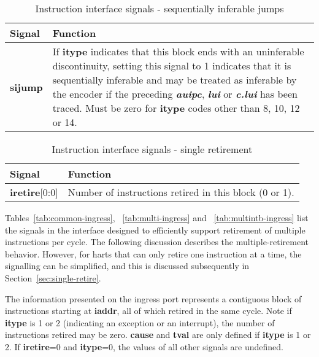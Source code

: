 \begin{table}[htp]
    \centering
    \caption{Instruction interface signals - sequentially inferable jumps}
    \label{tab:sij-ingress}
    \begin{tabulary}{\textwidth}{|l|p{120mm}|}
        \hline
        \textbf {Signal} & \textbf {Function} \\
        \hline
        \textbf{sijump} & If \textbf{itype} indicates that this block ends with an uninferable discontinuity, setting this signal to 1 
        indicates that it is sequentially inferable and may be treated as inferable by the encoder if the preceding 
        \textbf{\textit{auipc}}, \textbf{\textit{lui}} or \textbf{\textit{c.lui}} has been traced.  
        Must be zero for \textbf{itype} codes other than 8, 10, 12 or 14.\\
        \hline
    \end{tabulary}
\end{table}


\begin{table}[htp]
    \centering
    \caption{Instruction interface signals - single retirement}
    \label{tab:single-ingress}
    \begin{tabulary}{\textwidth}{|l|p{110mm}|}
        \hline
        \textbf {Signal} & \textbf {Function} \\
        \hline
        \textbf{iretire}[0:0] & Number of instructions retired in this block (0 or 1).\\
        \hline
    \end{tabulary}
\end{table}

Tables~\ref{tab:common-ingress}, ~\ref{tab:multi-ingress} and ~\ref{tab:multintb-ingress}
list the signals in the interface designed to efficiently support retirement of multiple 
instructions per cycle.  The following discussion describes the multiple-retirement behavior.  
However, for harts that can only retire one instruction at a time, the signalling can be 
simplified, and this is discussed subsequently in Section~\ref{sec:single-retire}.  

The information presented on the ingress port represents a contiguous
block of instructions starting at \textbf{iaddr}, all of which retired
in the same cycle. Note if \textbf{itype} is 1 or 2 (indicating an
exception or an interrupt), the number of instructions retired may be
zero. \textbf{cause} and \textbf{tval} are only defined if
\textbf{itype} is 1 or 2. If \textbf{iretire}=0 and \textbf{itype}=0,
the values of all other signals are undefined.


